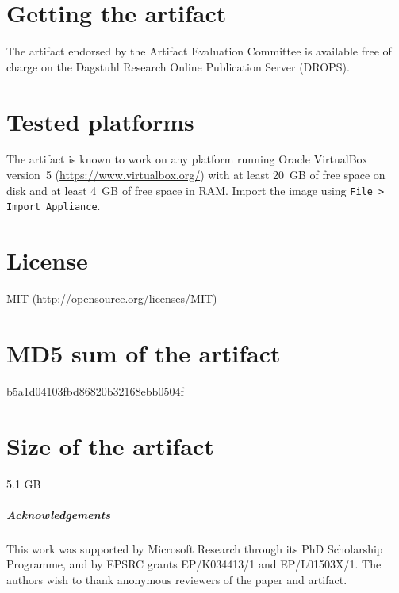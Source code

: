 \documentclass[a4paper,UKenglish]{darts}
\newenvironment{getting}{\section{Getting the artifact} The artifact 
endorsed by the Artifact Evaluation Committee is available free of 
charge on the Dagstuhl Research Online Publication Server (DROPS).}{}
\newenvironment{platforms}{\section{Tested platforms}}{}
\newcommand{\license}[1]{{\section{License}#1}}
\newcommand{\mdsum}[1]{{\section{MD5 sum of the artifact}#1}}
\newcommand{\artifactsize}[1]{{\section{Size of the artifact}#1}}
\begin{document}
\begin{getting}
\end{getting} 

\begin{platforms}
  The artifact is known to work on any platform running Oracle
  VirtualBox version~5 (\url{https://www.virtualbox.org/}) with at
  least 20~GB of free space on disk and at least 4~GB of free space in
  RAM.  Import the image using \texttt{File > Import Appliance}.
\end{platforms}

\license{MIT (\url{http://opensource.org/licenses/MIT})}

\mdsum{b5a1d04103fbd86820b32168ebb0504f}

\artifactsize{5.1 GB}

\subparagraph*{Acknowledgements}
This work was supported by Microsoft Research through its PhD
Scholarship Programme, and by EPSRC grants EP/K034413/1 and
EP/L01503X/1.  The authors wish to thank anonymous reviewers of the
paper and artifact.
\end{document}
